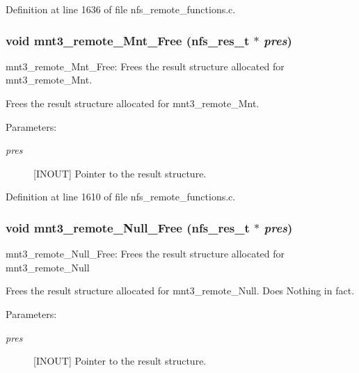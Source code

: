 Definition at line 1636 of file nfs\_\-remote\_\-functions.c.
\subsubsection[{mnt3\_\-remote\_\-Mnt\_\-Free}]{\setlength{\rightskip}{0pt plus 5cm}void mnt3\_\-remote\_\-Mnt\_\-Free (nfs\_\-res\_\-t $\ast$ {\em pres})}\label{group__NFSprocs_g60463b94ce11f43165d9c43ff8e8450c}


mnt3\_\-remote\_\-Mnt\_\-Free: Frees the result structure allocated for mnt3\_\-remote\_\-Mnt.

Frees the result structure allocated for mnt3\_\-remote\_\-Mnt.

\begin{Desc}
\item[Parameters:]
\begin{description}
\item[{\em pres}][INOUT] Pointer to the result structure. \end{description}
\end{Desc}


Definition at line 1610 of file nfs\_\-remote\_\-functions.c.
\subsubsection[{mnt3\_\-remote\_\-Null\_\-Free}]{\setlength{\rightskip}{0pt plus 5cm}void mnt3\_\-remote\_\-Null\_\-Free (nfs\_\-res\_\-t $\ast$ {\em pres})}\label{group__NFSprocs_g8c0b570a18705f3c27bf1a41561f6131}


mnt3\_\-remote\_\-Null\_\-Free: Frees the result structure allocated for mnt3\_\-remote\_\-Null

Frees the result structure allocated for mnt3\_\-remote\_\-Null. Does Nothing in fact.

\begin{Desc}
\item[Parameters:]
\begin{description}
\item[{\em pres}][INOUT] Pointer to the result structure. \end{description}
\end{Desc}


